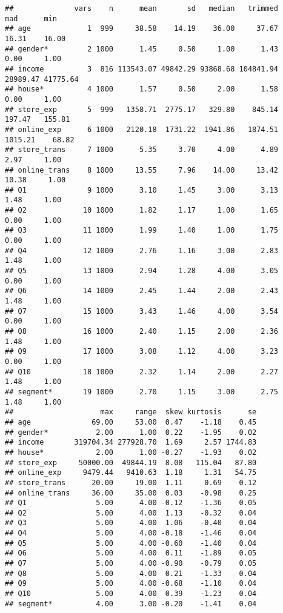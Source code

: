 \documentclass[
]{article}
\begin{document}
\begin{verbatim}
##              vars    n      mean       sd   median   trimmed      mad      min
## age             1  999     38.58    14.19    36.00     37.67    16.31    16.00
## gender*         2 1000      1.45     0.50     1.00      1.43     0.00     1.00
## income          3  816 113543.07 49842.29 93868.68 104841.94 28989.47 41775.64
## house*          4 1000      1.57     0.50     2.00      1.58     0.00     1.00
## store_exp       5  999   1358.71  2775.17   329.80    845.14   197.47   155.81
## online_exp      6 1000   2120.18  1731.22  1941.86   1874.51  1015.21    68.82
## store_trans     7 1000      5.35     3.70     4.00      4.89     2.97     1.00
## online_trans    8 1000     13.55     7.96    14.00     13.42    10.38     1.00
## Q1              9 1000      3.10     1.45     3.00      3.13     1.48     1.00
## Q2             10 1000      1.82     1.17     1.00      1.65     0.00     1.00
## Q3             11 1000      1.99     1.40     1.00      1.75     0.00     1.00
## Q4             12 1000      2.76     1.16     3.00      2.83     1.48     1.00
## Q5             13 1000      2.94     1.28     4.00      3.05     0.00     1.00
## Q6             14 1000      2.45     1.44     2.00      2.43     1.48     1.00
## Q7             15 1000      3.43     1.46     4.00      3.54     0.00     1.00
## Q8             16 1000      2.40     1.15     2.00      2.36     1.48     1.00
## Q9             17 1000      3.08     1.12     4.00      3.23     0.00     1.00
## Q10            18 1000      2.32     1.14     2.00      2.27     1.48     1.00
## segment*       19 1000      2.70     1.15     3.00      2.75     1.48     1.00
##                    max     range  skew kurtosis      se
## age              69.00     53.00  0.47    -1.18    0.45
## gender*           2.00      1.00  0.22    -1.95    0.02
## income       319704.34 277928.70  1.69     2.57 1744.83
## house*            2.00      1.00 -0.27    -1.93    0.02
## store_exp     50000.00  49844.19  8.08   115.04   87.80
## online_exp     9479.44   9410.63  1.18     1.31   54.75
## store_trans      20.00     19.00  1.11     0.69    0.12
## online_trans     36.00     35.00  0.03    -0.98    0.25
## Q1                5.00      4.00 -0.12    -1.36    0.05
## Q2                5.00      4.00  1.13    -0.32    0.04
## Q3                5.00      4.00  1.06    -0.40    0.04
## Q4                5.00      4.00 -0.18    -1.46    0.04
## Q5                5.00      4.00 -0.60    -1.40    0.04
## Q6                5.00      4.00  0.11    -1.89    0.05
## Q7                5.00      4.00 -0.90    -0.79    0.05
## Q8                5.00      4.00  0.21    -1.33    0.04
## Q9                5.00      4.00 -0.68    -1.10    0.04
## Q10               5.00      4.00  0.39    -1.23    0.04
## segment*          4.00      3.00 -0.20    -1.41    0.04
\end{verbatim}
\end{document}
